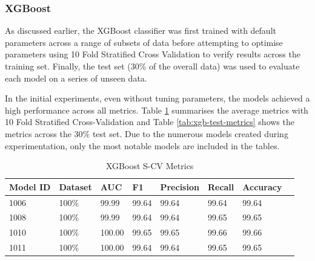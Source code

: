  \newpage

\subsubsection{XGBoost}
\label{sec:xgboost}

As discussed earlier, the XGBoost classifier was first trained with default parameters across a range of subsets of data before attempting to optimise parameters using 10 Fold Stratified Cross Validation to verify results across the training set. Finally, the test set (30\% of the overall data) was used to evaluate each model on a series of unseen data.

In the initial experiments, even without tuning parameters, the models achieved a high performance across all metrics. Table \ref{tab:xgb-scv-metrics} summarises the average metrics with 10 Fold Stratified Cross-Validation and Table \ref{tab:xgb-test-metrics} shows the metrics across the 30\% test set. Due to the numerous models created during experimentation, only the most notable models are included in the tables.


\begin{table}[h]
\centering
\caption{XGBoost S-CV Metrics}
\label{tab:xgb-scv-metrics}
\begin{tabular}{|l|l|l|l|l|l|l|l|}
\hline
\textbf{Model ID} & \textbf{Dataset} & \textbf{AUC} & \textbf{F1} & \textbf{Precision} & \textbf{Recall} & \textbf{Accuracy}  \\ \hline
1006 & 100\% & 99.99 & 99.64 & 99.64 & 99.64 & 99.64 \\ \hline
1008 & 100\% & 99.99 & 99.64 & 99.64 & 99.65 & 99.65 \\ \hline
1010 & 100\% & 100.00 & 99.65 & 99.65 & 99.66 & 99.66 \\ \hline
1011 & 100\% & 100.00 & 99.64 & 99.64 & 99.65 & 99.65 \\ \hline
\end{tabular}
\end{table}



